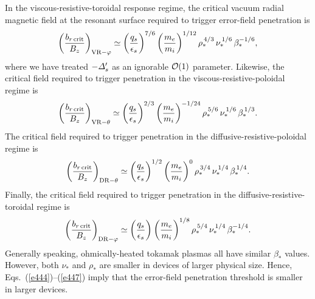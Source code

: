 \documentclass[12pt,prb,aps]{revtex4-1}
\begin{document}
In the viscous-resistive-toroidal response regime, the critical vacuum radial magnetic
field at the resonant surface required to
trigger error-field penetration is\,\cite{cole}
\begin{equation}\label{e444}
\left(\frac{b_{r\,{\rm crit}}}{B_z}\right)_{{\rm VR}-\varphi} \simeq \left(\frac{q_s}{\epsilon_s}\right)^{7/6}\left(\frac{m_e}{m_i}\right)^{1/12}
\rho_\ast^{\,4/3}\,\nu_\ast^{\,1/6}\,\beta_\ast^{-1/6},
\end{equation}
where we have treated $-{\mit\Delta}_s'$ as an ignorable ${\cal O}(1)$ parameter. Likewise,  the critical
field required to trigger penetration in the viscous-resistive-poloidal regime is
\begin{equation}
\left(\frac{b_{r\,{\rm crit}}}{B_z}\right)_{{\rm VR}-\theta} \simeq  \left(\frac{q_s}{\epsilon_s}\right)^{2/3}\left(\frac{m_e}{m_i}\right)^{-1/24}
\rho_\ast^{\,5/6}\,\nu_\ast^{\,1/6}\,\beta_\ast^{\,1/3}.
\end{equation}
The critical field required to trigger penetration in the diffusive-resistive-poloidal regime is
\begin{equation}
\left(\frac{b_{r\,{\rm crit}}}{B_z}\right)_{{\rm DR}-\theta} \simeq  \left(\frac{q_s}{\epsilon_s}\right)^{1/2}\left(\frac{m_e}{m_i}\right)^{0}
\rho_\ast^{\,3/4}\,\nu_\ast^{\,1/4}\,\beta_\ast^{\,1/4}.
\end{equation}
Finally, the critical field 
required to  trigger penetration in the diffusive-resistive-toroidal regime is
\begin{equation}
\left(\frac{b_{r\,{\rm crit}}}{B_z}\right)_{{\rm DR}-\varphi} \simeq  \left(\frac{q_s}{\epsilon_s}\right)^{}\left(\frac{m_e}{m_i}\right)^{1/8}
\rho_\ast^{\,5/4}\,\nu_\ast^{\,1/4}\,\beta_\ast^{-1/4}.\label{e447}
\end{equation}
Generally speaking, ohmically-heated tokamak plasmas all  have similar $\beta_\ast$ values. However,
both $\nu_\ast$ and $\rho_\ast$ are smaller in devices of larger physical size. Hence, Eqs.~(\ref{e444})--(\ref{e447})
imply that the error-field penetration threshold is smaller in larger devices. 
\end{document}

